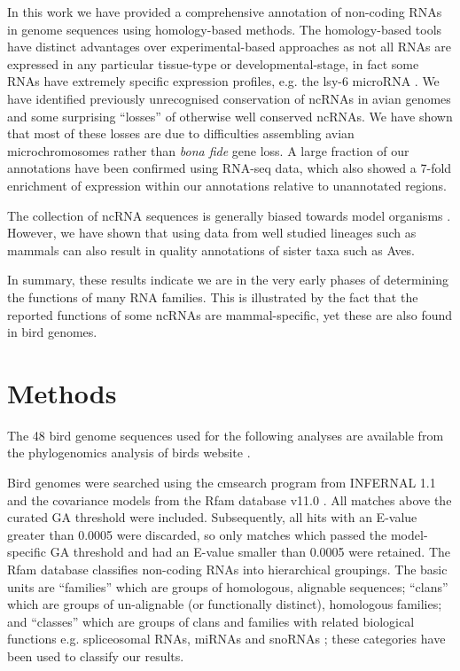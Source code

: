 \documentclass[10pt]{bmc_article}
\newenvironment{bmcformat}{\begin{raggedright}\baselineskip20pt\sloppy\setboolean{publ}{false}}{\end{raggedright}\baselineskip20pt\sloppy}
\begin{document}
\begin{bmcformat}
In this work we have provided a comprehensive annotation of non-coding
RNAs in genome sequences using homology-based methods. The
homology-based tools have distinct advantages over experimental-based
approaches as not all RNAs are expressed in any particular tissue-type
or developmental-stage, in fact some RNAs have extremely specific
expression profiles, e.g. the lsy-6 microRNA \cite{Johnston:2003}.  We
have identified previously unrecognised conservation of ncRNAs in
avian genomes and some surprising ``losses'' of otherwise well
conserved ncRNAs. We have shown that most of these losses are due to
difficulties assembling avian microchromosomes rather than \emph{bona
  fide} gene loss. A large fraction of our annotations have been
confirmed using RNA-seq data, which also showed a 7-fold enrichment of
expression within our annotations relative to unannotated regions.

The collection of ncRNA sequences is generally biased towards model
organisms \cite{Gardner:2010,Hoeppner:2012}. However, we have shown
that using data from well studied lineages such as mammals can also
result in quality annotations of sister taxa such as Aves.

In summary, these results indicate we are in the very early phases of
determining the functions of many RNA families. This is illustrated by
the fact that the reported functions of some ncRNAs are
mammal-specific, yet these are also found in bird genomes.


\section*{Methods}

The 48 bird genome sequences used for the following analyses are available from
the phylogenomics analysis of birds website \cite{birdphylogen}.

Bird genomes were searched using the cmsearch program from INFERNAL
1.1 and the covariance models from the Rfam database
v11.0 \cite{Gardner:2011a,Burge:2013}. All matches above the curated GA
threshold were included. Subsequently, all hits with an E-value
greater than 0.0005 were discarded, so only matches which passed the
model-specific GA threshold and had an E-value smaller than 0.0005
were retained. The Rfam database classifies non-coding RNAs into
hierarchical groupings. The basic units are ``families'' which are
groups of homologous, alignable sequences; ``clans'' which are groups
of un-alignable (or functionally distinct), homologous families; and
``classes'' which are groups of clans and families with related
biological functions e.g. spliceosomal RNAs, miRNAs and snoRNAs
\cite{Griffiths-Jones:2003,Griffiths-Jones:2005,Gardner:2009,Gardner:2011a,Burge:2013};
these categories have been used to classify our results.


\end{bmcformat}
\end{document}
